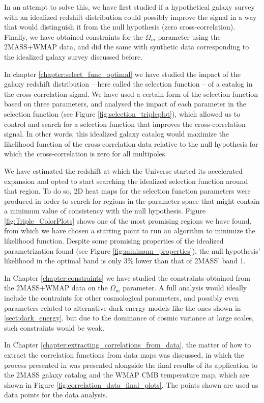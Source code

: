 \documentclass[openany,a4paper,12pt,oneside]{book}
\begin{document}
\begin{spacing}{1.5}
In an attempt to solve this, we have first studied if a hypothetical galaxy survey with an idealized redshift distribution could possibly improve the signal in a way that would distinguish it from the null hypothesis (zero cross-correlation). Finally, we have obtained constraints for the $\Omega_m$ parameter using the 2MASS+WMAP data, and did the same with synthetic data corresponding to the idealized galaxy survey discussed before.

In chapter \ref{chapter:select_func_optimal} we have studied the impact of the galaxy redshift distribution -- here called the selection function -- of a catalog in the cross-correlation signal. We have used a certain form of the selection function based on three parameters, and analysed the impact of each parameter in the selection function (see Figure \ref{fig:selection_tripleplot}), which allowed us to control and search for a selection function that improves the cross-correlation signal. In other words, this idealized galaxy catalog would maximize the likelihood function of the cross-correlation data relative to the null hypothesis for which the cross-correlation is zero for all multipoles. 

We have estimated the redshift at which the Universe started its accelerated expansion and opted to start searching the idealized selection function around that region. To do so, 2D heat maps for the selection function parameters were produced in order to search for regions in the parameter space that might contain a minimum value of consistency with the null hypothesis. Figure \ref{fig:Triple_ColorPlots} shows one of the most promising regions we have found, from which we have chosen a starting point to run an algorithm to minimize the likelihood function. Despite some promising properties of the idealized parametrization found (see Figure \ref{fig:minimum_properties}), the null hypothesis' likelihood in the optimal band is only $3\%$ lower than that of 2MASS' band 1.

In Chapter \ref{chapter:constraints} we have studied the constraints obtained from the 2MASS+WMAP data on the $\Omega_m$ parameter. A full analysis would ideally include the contraints for other cosmological parameters, and possibly even parameters related to alternative dark energy models like the ones shown in \ref{sect:dark_energy}, but due to the dominance of cosmic variance at large scales, such constraints would be weak.

In Chapter \ref{chapter:extracting_correlations_from_data}, the matter of how to extract the correlation functions from data maps was discussed, in which the process presented in \cite{Moura-Santos_2016} was presented alongside the final results of its application to the 2MASS galaxy catalog and the WMAP CMB temperature map, which are shown in Figure \ref{fig:correlation_data_final_plots}. The points shown are used as data points for the data analysis. 


\end{spacing}
\end{document}
